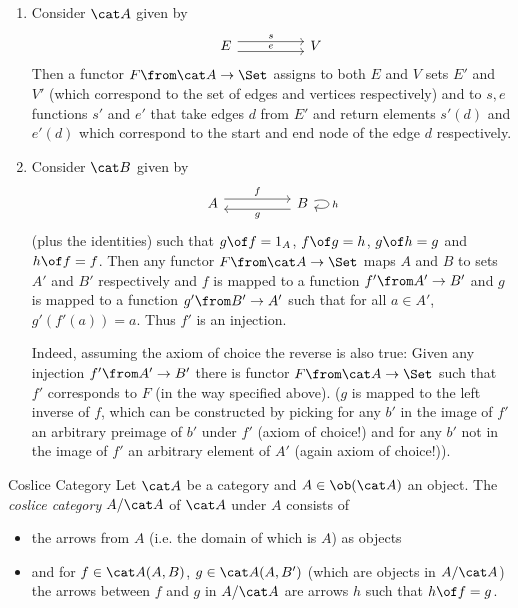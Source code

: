 \begin{answer}
  \begin{enumerate}
  \item Consider $\A$ given by
    \[
      \begin{tikzcd}[column sep=huge,row sep=huge]
        E\arrow[r,yshift=.85ex,"s"] \arrow[r,below,yshift=-.85ex,"e"]&V
      \end{tikzcd}
    \]
    Then a functor $F\from \A\to\Set$ assigns to both $E$ and $V$ sets $E'$ and $V'$ (which correspond to the set of edges and vertices respectively) and to $s,e$ functions $s'$ and $e'$ that take edges $d$ from $E'$ and return elements $s'(d)$ and $e'(d)$ which correspond to the start and end node of the edge $d$ respectively.
  \item Consider $\B$ given by
    \[
      \begin{tikzcd}[column sep=huge,row sep=huge]
        A\arrow[r,yshift=.85ex,"f"] & B\arrow[l,below,yshift=-.85ex,"g"] \arrow[loop right,"h"]
      \end{tikzcd}
    \]
    (plus the identities) such that $g\of f=1_A$, $f\of g=h$, $g\of h=g$ and $h\of f=f$. Then any functor $F\from\A\to\Set$ maps $A$ and $B$ to sets $A'$ and $B'$ respectively and $f$ is mapped to a function $f'\from A'\to B'$ and $g$ is mapped to a function $g'\from B'\to A'$ such that for all $a\in A'$, $g'(f'(a))=a$. Thus $f'$ is an injection.

    Indeed, assuming the axiom of choice the reverse is also true: Given any injection $f'\from A'\to B'$ there is functor $F\from \A\to\Set$ such that $f'$ corresponds to $F$ (in the way specified above). ($g$ is mapped to the left inverse of $f$, which can be constructed by picking for any $b'$ in the image of $f'$ an arbitrary preimage of $b'$ under $f'$ (axiom of choice!) and for any $b'$ not in the image of $f'$ an arbitrary element of $A'$ (again axiom of choice!)).
  \end{enumerate}
\end{answer}


\begin{definition}{Coslice Category}
  Let $\A$ be a category and $A\in\ob(\A)$ an object. The \emph{coslice category} $A/\A$ of $\A$ under $A$ consists of
  \begin{itemize}
  \item the arrows from $A$ (i.e. the domain of which is $A$) as objects
  \item and for $f\in \A(A,B)$, $g\in\A(A,B')$ (which are objects in $A/\A$) the arrows between $f$ and $g$ in $A/\A$ are arrows $h$ such that $h\of f=g$.
  \end{itemize}
\end{definition}

